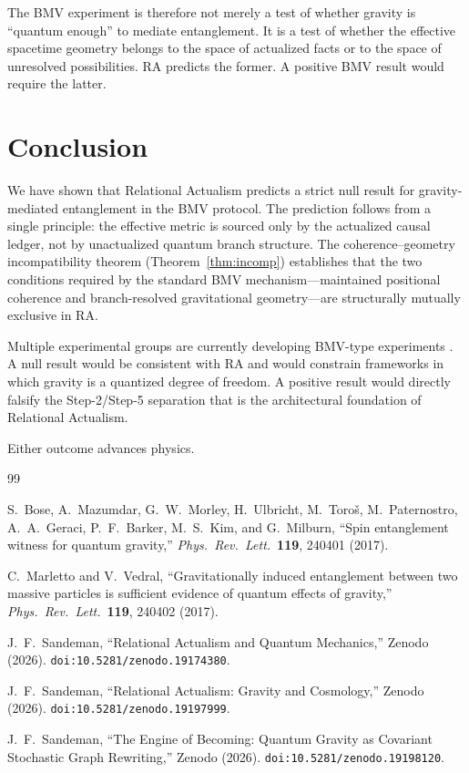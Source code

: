 \documentclass[12pt,a4paper]{article}
\begin{document}
The BMV experiment is therefore not merely a test of whether gravity
is ``quantum enough'' to mediate entanglement. It is a test of
whether the effective spacetime geometry belongs to the space of
actualized facts or to the space of unresolved possibilities. RA
predicts the former. A positive BMV result would require the latter.

\section{Conclusion}
\label{sec:conclusion}

We have shown that Relational Actualism predicts a strict null result
for gravity-mediated entanglement in the BMV protocol. The prediction
follows from a single principle: the effective metric is sourced only
by the actualized causal ledger, not by unactualized quantum branch
structure. The coherence--geometry incompatibility theorem
(Theorem~\ref{thm:incomp}) establishes that the two conditions
required by the standard BMV mechanism---maintained positional
coherence and branch-resolved gravitational geometry---are
structurally mutually exclusive in RA.

Multiple experimental groups are currently developing BMV-type
experiments \cite{Bose2017,Marletto2017}. A null result would be
consistent with RA and would constrain frameworks in which gravity
is a quantized degree of freedom. A positive result would directly
falsify the Step-2/Step-5 separation that is the architectural
foundation of Relational Actualism.

Either outcome advances physics.

\begin{thebibliography}{99}

S.~Bose, A.~Mazumdar, G.~W.~Morley, H.~Ulbricht, M.~Toro\v{s},
M.~Paternostro, A.~A.~Geraci, P.~F.~Barker, M.~S.~Kim, and
G.~Milburn, ``Spin entanglement witness for quantum gravity,''
\emph{Phys.\ Rev.\ Lett.}\ \textbf{119}, 240401 (2017).

C.~Marletto and V.~Vedral, ``Gravitationally induced
entanglement between two massive particles is sufficient
evidence of quantum effects of gravity,''
\emph{Phys.\ Rev.\ Lett.}\ \textbf{119}, 240402 (2017).

J.~F.~Sandeman, ``Relational Actualism and Quantum Mechanics,''
Zenodo (2026). \texttt{doi:10.5281/zenodo.19174380}.

J.~F.~Sandeman, ``Relational Actualism: Gravity and Cosmology,''
Zenodo (2026). \texttt{doi:10.5281/zenodo.19197999}.

J.~F.~Sandeman, ``The Engine of Becoming: Quantum Gravity as
Covariant Stochastic Graph Rewriting,''
Zenodo (2026). \texttt{doi:10.5281/zenodo.19198120}.

\end{thebibliography}
\end{document}
